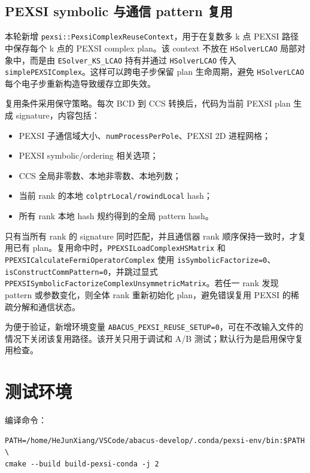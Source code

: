 \documentclass[a4paper,11pt]{article}
\newcommand{\code}[1]{\texttt{#1}}
\begin{document}
\subsection{PEXSI symbolic 与通信 pattern 复用}

本轮新增 \code{pexsi::PexsiComplexReuseContext}，用于在复数多 k 点 PEXSI 路径中保存每个 k 点的 PEXSI complex plan。该 context 不放在 \code{HSolverLCAO} 局部对象中，而是由 \code{ESolver\_KS\_LCAO} 持有并通过 \code{HSolverLCAO} 传入 \code{simplePEXSIComplex}。这样可以跨电子步保留 plan 生命周期，避免 \code{HSolverLCAO} 每个电子步重新构造导致缓存立即失效。

复用条件采用保守策略。每次 BCD 到 CCS 转换后，代码为当前 PEXSI plan 生成 signature，内容包括：

\begin{itemize}
    \item PEXSI 子通信域大小、\code{numProcessPerPole}、PEXSI 2D 进程网格；
    \item PEXSI symbolic/ordering 相关选项；
    \item CCS 全局非零数、本地非零数、本地列数；
    \item 当前 rank 的本地 \code{colptrLocal/rowindLocal} hash；
    \item 所有 rank 本地 hash 规约得到的全局 pattern hash。
\end{itemize}

只有当所有 rank 的 signature 同时匹配，并且通信器 rank 顺序保持一致时，才复用已有 plan。复用命中时，\code{PPEXSILoadComplexHSMatrix} 和 \code{PPEXSICalculateFermiOperatorComplex} 使用 \code{isSymbolicFactorize=0}、\code{isConstructCommPattern=0}，并跳过显式 \code{PPEXSISymbolicFactorizeComplexUnsymmetricMatrix}。若任一 rank 发现 pattern 或参数变化，则全体 rank 重新初始化 plan，避免错误复用 PEXSI 的稀疏分解和通信状态。

为便于验证，新增环境变量 \code{ABACUS\_PEXSI\_REUSE\_SETUP=0}，可在不改输入文件的情况下关闭该复用路径。该开关只用于调试和 A/B 测试；默认行为是启用保守复用检查。

\section{测试环境}

编译命令：

\begin{verbatim}
PATH=/home/HeJunXiang/VSCode/abacus-develop/.conda/pexsi-env/bin:$PATH \
cmake --build build-pexsi-conda -j 2
\end{verbatim}
\end{document}

